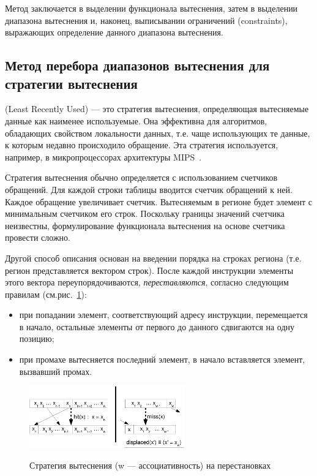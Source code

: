 Метод заключается в выделении функционала вытеснения, затем в выделении диапазона
вытеснения и, наконец, выписывании ограничений (constraints), выражающих
определение данного диапазона вытеснения.

\subsection{Метод перебора диапазонов вытеснения для стратегии
вытеснения \LRU}\label{sec:LRU_constraints}

\LRU (Least Recently Used) --- это стратегия вытеснения,
определяющая вытесняемые данные как наименее используемые. Она
эффективна для алгоритмов, обладающих свойством локальности данных,
т.е. чаще использующих те данные, к которым недавно происходило
обращение. Эта стратегия используется, например, в микропроцессорах
архитектуры MIPS~\cite{mips64II}.

Стратегия вытеснения \LRU обычно определяется с использованием
счетчиков обращений. Для каждой строки таблицы
вводится счетчик обращений к ней. Каждое обращение увеличивает
счетчик. Вытесняемым в регионе будет элемент с минимальным счетчиком его строк.
Поскольку границы значений счетчика неизвестны, формулирование
функционала вытеснения на основе счетчика провести сложно.

Другой способ описания \LRU основан на введении порядка на строках региона (т.е.
регион представляется вектором строк). После каждой
инструкции элементы этого вектора переупорядочиваются, \emph{переставляются}, согласно следующим правилам (см.рис.~\ref{fig:lru1}):
\begin{itemize}
\item при попадании элемент, соответствующий адресу инструкции,
перемещается в начало, остальные элементы от первого до данного
сдвигаются на одну позицию;
\item при промахе вытесняется последний элемент, в начало
вставляется элемент, вызвавший промах.
\end{itemize}

\begin{figure}[h] \center
  \includegraphics[width=0.6\textwidth]{2.theor/lru1}\\
  \caption{Стратегия вытеснения \LRU (w --- ассоциативность) на
перестановках}\label{fig:lru1}
\end{figure}

